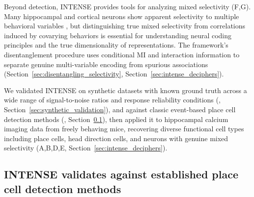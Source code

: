 Beyond detection, INTENSE provides tools for analyzing mixed selectivity
(F,G). Many hippocampal and cortical neurons show apparent
selectivity to multiple behavioral variables \cite{mix2,mix3}, but distinguishing
true mixed selectivity from correlations induced by covarying behaviors is essential
for understanding neural coding principles and the true dimensionality of
representations. The framework's disentanglement procedure uses conditional MI and interaction
information \cite{ghassami2017} to separate genuine multi-variable encoding from
spurious associations (Section~\ref{sec:disentangling_selectivity},
Section~\ref{sec:intense_deciphers}).

We validated INTENSE on synthetic datasets with known ground truth across a wide
range of signal-to-noise ratios and response reliability conditions
(, Section~\ref{sec:synthetic_validation}), and against
classic event-based place cell detection methods
(, Section~\ref{sec:intense_validates}), then applied it to
hippocampal calcium imaging data from freely behaving mice, recovering diverse
functional cell types including place cells, head direction cells, and neurons with
genuine mixed selectivity (A,B,D,E,
Section~\ref{sec:intense_deciphers}).


\subsection{INTENSE validates against established place cell detection methods}
\label{sec:intense_validates}

